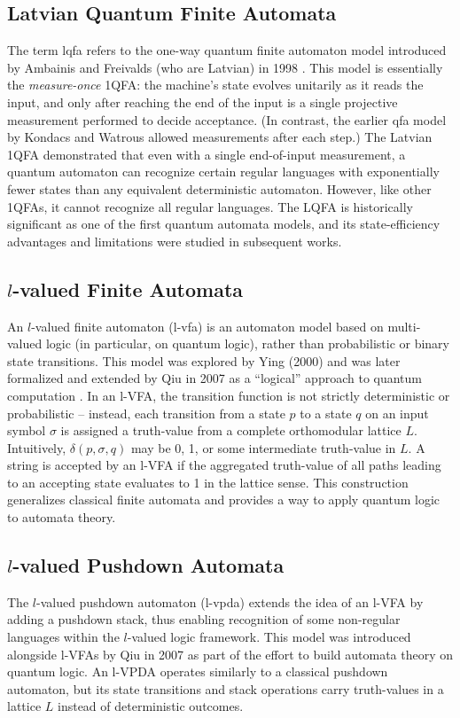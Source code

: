 \subsection{Latvian Quantum Finite Automata} 
The term \gls{lqfa} refers to the one-way quantum finite automaton model introduced by Ambainis and Freivalds (who are Latvian) in 1998 \cite{ambainis1998one}. This model is essentially the \emph{measure-once} 1QFA: the machine’s state evolves unitarily as it reads the input, and only after reaching the end of the input is a single projective measurement performed to decide acceptance. (In contrast, the earlier \gls{qfa} model by Kondacs and Watrous allowed measurements after each step.) The Latvian 1QFA demonstrated that even with a single end-of-input measurement, a quantum automaton can recognize certain regular languages with exponentially fewer states than any equivalent deterministic automaton. However, like other 1QFAs, it cannot recognize all regular languages. The LQFA is historically significant as one of the first quantum automata models, and its state-efficiency advantages and limitations were studied in subsequent works.

\subsection{\texorpdfstring{$l$}{l}-valued Finite Automata} 
An $l$-valued finite automaton (\gls{l-vfa}) is an automaton model based on multi-valued logic (in particular, on quantum logic), rather than probabilistic or binary state transitions. This model was explored by Ying (2000) and was later formalized and extended by Qiu in 2007 as a “logical” approach to quantum computation \cite{qiu2007automata}. In an l-VFA, the transition function is not strictly deterministic or probabilistic – instead, each transition from a state $p$ to a state $q$ on an input symbol $\sigma$ is assigned a truth-value from a complete orthomodular lattice $L$. Intuitively, $\delta(p,\sigma,q)$ may be 0, 1, or some intermediate truth-value in $L$. A string is accepted by an l-VFA if the aggregated truth-value of all paths leading to an accepting state evaluates to 1 in the lattice sense. This construction generalizes classical finite automata and provides a way to apply quantum logic to automata theory.

\subsection{\texorpdfstring{$l$}{l}-valued Pushdown Automata} 
The $l$-valued pushdown automaton (\gls{l-vpda}) extends the idea of an l-VFA by adding a pushdown stack, thus enabling recognition of some non-regular languages within the $l$-valued logic framework. This model was introduced alongside l-VFAs by Qiu in 2007 \cite{qiu2007automata} as part of the effort to build automata theory on quantum logic. An l-VPDA operates similarly to a classical pushdown automaton, but its state transitions and stack operations carry truth-values in a lattice $L$ instead of deterministic outcomes.

